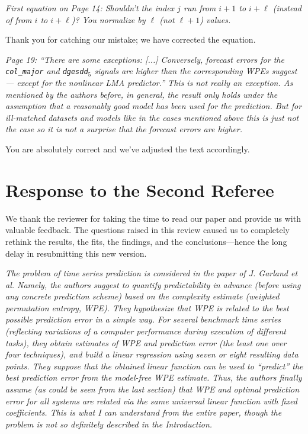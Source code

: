 \documentclass[12pt]{article}
\begin{document}
\emph{First equation on Page 14: Shouldn't the index $j$ run from $i+1$ to
$i+\ell$ (instead of from $i$ to $i+\ell$)? You normalize by $\ell$ (not
$\ell+1$) values.}

Thank you for catching our mistake; we have corrected the equation.

\smallskip

\emph{Page 19: ``There are some exceptions: [...] Conversely, forecast errors
for the \texttt{col\_major} and \texttt{dgesdd$_5$} signals are higher than the
corresponding WPEs suggest --- except for the nonlinear LMA predictor.'' This is
not really an exception. As mentioned by the authors before, in general, the
result only holds under the assumption that a reasonably good model has been
used for the prediction. But for ill-matched datasets and models like in the
cases mentioned above this is just not the case so it is not a surprise that the
forecast errors are higher.}

You are absolutely correct and we've adjusted the text accordingly.

\section*{Response to the Second Referee}

We thank the reviewer for taking the time to read our paper and
provide us with valuable feedback.  The questions raised in this
review caused us to completely rethink the results, the fits, the
findings, and the conclusions---hence the long delay in resubmitting
this new version.

\smallskip

\emph{The problem of time series prediction is considered in the paper
  of J.  Garland et al. Namely, the authors suggest to quantify
  predictability in advance (before using any concrete prediction
  scheme) based on the complexity estimate (weighted permutation
  entropy, WPE). They hypothesize that WPE is related to the best
  possible prediction error in a simple way. For several benchmark
  time series (reflecting variations of a computer performance during
  execution of different tasks), they obtain estimates of WPE and
  prediction error (the least one over four techniques), and build a
  linear regression using seven or eight resulting data points. They
  suppose that the obtained linear function can be used to ``predict''
  the best prediction error from the model-free WPE estimate.  Thus,
  the authors finally assume (as could be seen from the last section)
  that WPE and optimal prediction error for all systems are related
  via the same universal linear function with fixed coefficients. This
  is what I can understand from the entire paper, though the problem
  is not so definitely described in the Introduction.}
\end{document}
